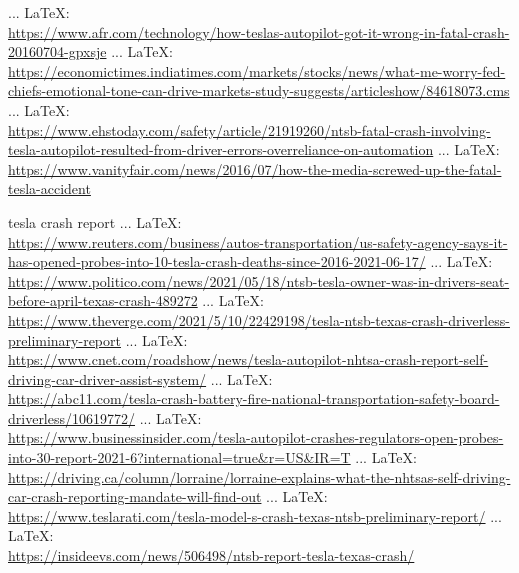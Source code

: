 \begin{thebibliography}{99}
{{{{{ ... \LaTeX:\\ \url{https://www.afr.com/technology/how-teslas-autopilot-got-it-wrong-in-fatal-crash-20160704-gpxsje}
 ... \LaTeX:\\ \url{https://economictimes.indiatimes.com/markets/stocks/news/what-me-worry-fed-chiefs-emotional-tone-can-drive-markets-study-suggests/articleshow/84618073.cms}
 ... \LaTeX:\\ \url{https://www.ehstoday.com/safety/article/21919260/ntsb-fatal-crash-involving-tesla-autopilot-resulted-from-driver-errors-overreliance-on-automation}
 ... \LaTeX:\\ \url{https://www.vanityfair.com/news/2016/07/how-the-media-screwed-up-the-fatal-tesla-accident}


tesla crash report
 ... \LaTeX:\\ \url{https://www.reuters.com/business/autos-transportation/us-safety-agency-says-it-has-opened-probes-into-10-tesla-crash-deaths-since-2016-2021-06-17/}
 ... \LaTeX:\\ \url{https://www.politico.com/news/2021/05/18/ntsb-tesla-owner-was-in-drivers-seat-before-april-texas-crash-489272}
 ... \LaTeX:\\ \url{https://www.theverge.com/2021/5/10/22429198/tesla-ntsb-texas-crash-driverless-preliminary-report}
 ... \LaTeX:\\ \url{https://www.cnet.com/roadshow/news/tesla-autopilot-nhtsa-crash-report-self-driving-car-driver-assist-system/}
 ... \LaTeX:\\ \url{https://abc11.com/tesla-crash-battery-fire-national-transportation-safety-board-driverless/10619772/}
 ... \LaTeX:\\ \url{https://www.businessinsider.com/tesla-autopilot-crashes-regulators-open-probes-into-30-report-2021-6?international=true&r=US&IR=T}
 ... \LaTeX:\\ \url{https://driving.ca/column/lorraine/lorraine-explains-what-the-nhtsas-self-driving-car-crash-reporting-mandate-will-find-out}
 ... \LaTeX:\\ \url{https://www.teslarati.com/tesla-model-s-crash-texas-ntsb-preliminary-report/}
 ... \LaTeX:\\ \url{https://insideevs.com/news/506498/ntsb-report-tesla-texas-crash/}
}}}}}
\end{thebibliography}
